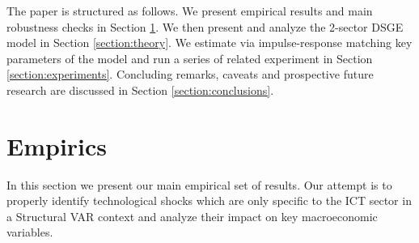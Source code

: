 \documentclass[12pt]{article}
\begin{document}
\begin{comment}
Our paper is mainly related to three strands of literature. First of all, we link to the literature that investigates the recent slowdown in TFP growth. Our project is motivated by papers such as \cite{oliner2007explaining}, \cite{jorgenson2008retrospective}, \cite{byrne2016does}, \cite{cette2016pre}, and \cite{fernald2017disappointing} who document that the slowdown in TFP growth occurred before the recession implying that the financial crisis per se cannot be its cause.\footnote{In particular, in line with our results, also \cite{fernald2017disappointing} conclude that the pause in the information technology revolution is the main candidate explanation.} Secondly, our project is related to the literature that investigate the effects of investment-specific technology shocks in a multi-sector economy. In particular, throughout the paper our main references will be \cite{greenwood1997long}, \cite{oulton2007investment}, and \cite{fisher2006dynamic}. However, both the empirical exercise and the theoretical model are strictly related to \cite{greenwood2000role}, \cite{basu2010sector}, and \cite{justiniano2011investment}. Finally, this paper is also related to papers that argue that information and communication technology is the current general-purpose technology. Main references will be bresnan, and \cite{basu2007information}.
\end{comment}

The paper is structured as follows. We present empirical results and main robustness checks in Section \ref{section:empirics}. We then present and analyze the 2-sector DSGE model in Section \ref{section:theory}. We estimate via impulse-response matching key parameters of the model and run a series of related experiment in Section \ref{section:experiments}. Concluding remarks, caveats and prospective future research are discussed in Section \ref{section:conclusions}.



\section{Empirics}\label{section:empirics}

In this section we present our main empirical set of results. Our attempt is to properly identify technological shocks which are only specific to the ICT sector in a Structural VAR context and analyze their impact on key macroeconomic variables.
\end{document}
